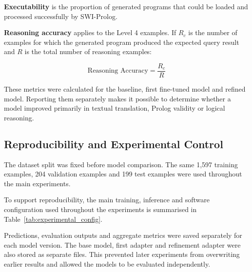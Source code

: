 \documentclass[11pt]{article} %
\theoremstyle{plain}
\theoremstyle{definition}
\begin{document}
\textbf{Executability} is the proportion of generated programs that could be
loaded and processed successfully by SWI-Prolog.

\textbf{Reasoning accuracy} applies to the Level 4 examples. If \(R_c\) is the
number of examples for which the generated program produced the expected query
result and \(R\) is the total number of reasoning examples:

$$
    \text{Reasoning Accuracy} = \frac{R_c}{R}
$$

These metrics were calculated for the baseline, first fine-tuned model and
refined model. Reporting them separately makes it possible to determine whether
a model improved primarily in textual translation, Prolog validity or logical
reasoning.

\subsection{Reproducibility and Experimental Control}

The dataset split was fixed before model comparison. The same 1,597 training
examples, 204 validation examples and 199 test examples were used throughout the
main experiments.

To support reproducibility, the main training, inference and software
configuration used throughout the experiments is summarised in
Table~\ref{tab:experimental_config}.

Predictions, evaluation outputs and aggregate metrics were saved separately for
each model version. The base model, first adapter and refinement adapter were
also stored as separate files. This prevented later experiments from overwriting
earlier results and allowed the models to be evaluated independently.
\end{document}
